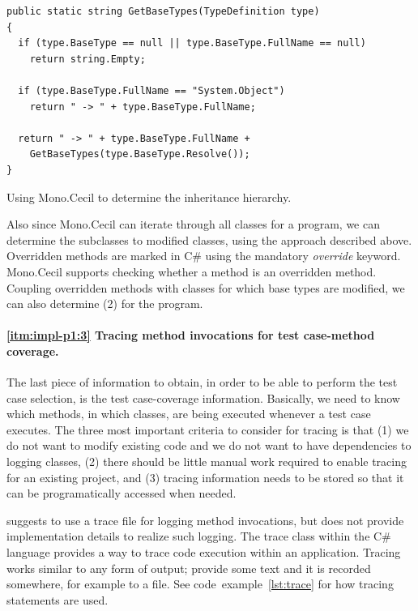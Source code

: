 \documentclass[a4paper,english,12pt]{report}
\begin{document}
\begin{listing}[htbp]
{\footnotesize
\begin{verbatim}
public static string GetBaseTypes(TypeDefinition type)
{
  if (type.BaseType == null || type.BaseType.FullName == null)
    return string.Empty;

  if (type.BaseType.FullName == "System.Object")
    return " -> " + type.BaseType.FullName;

  return " -> " + type.BaseType.FullName + 
    GetBaseTypes(type.BaseType.Resolve());
}
\end{verbatim}
}
\caption{Using Mono.Cecil to determine the inheritance hierarchy.}
\label{lst:base-classes}
\end{listing}

Also since Mono.Cecil can iterate through all classes for a program, we can determine the subclasses to modified classes, using the approach described above. Overridden methods are marked in C\# using the mandatory \textit{override} keyword. Mono.Cecil supports checking whether a method is an overridden method. Coupling overridden methods with classes for which base types are modified, we can also determine (2) for the program.

\paragraph{\ref{itm:impl-p1:3} Tracing method invocations for test case-method coverage.} The last piece of information to obtain, in order to be able to perform the test case selection, is the test case-coverage information. Basically, we need to know which methods, in which classes, are being executed whenever a test case executes. The three most important criteria to consider for tracing is that (1) we do not want to modify existing code and we do not want to have dependencies to logging classes, (2) there should be little manual work required to enable tracing for an existing project, and (3) tracing information needs to be stored so that it can be programatically accessed when needed.

\citet{mansour2009regression} suggests to use a trace file for logging method invocations, but does not provide implementation details to realize such logging. The trace class within the C\# language provides a way to trace code execution within an application. Tracing works similar to any form of output; provide some text and it is recorded somewhere, for example to a file. See code~example~\vref{lst:trace} for how tracing statements are used.
\end{document}
